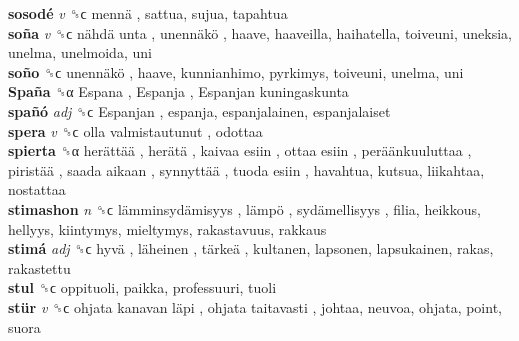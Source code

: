 \textbf{sosodé} \emph{v}  ␝ϲ   mennä , sattua, sujua, tapahtua  \\
\textbf{soña} \emph{v}  ␝ϲ   nähdä unta ,  unennäkö , haave, haaveilla, haihatella, toiveuni, uneksia, unelma, unelmoida, uni  \\
\textbf{soño} ␝ϲ   unennäkö , haave, kunnianhimo, pyrkimys, toiveuni, unelma, uni  \\
\textbf{Spaña} ␝α   Espana ,  Espanja ,  Espanjan kuningaskunta   \\
\textbf{spañó} \emph{adj}  ␝ϲ   Espanjan , espanja, espanjalainen, espanjalaiset  \\
\textbf{spera} \emph{v}  ␝ϲ   olla valmistautunut , odottaa  \\
\textbf{spierta} ␝α   herättää ,  herätä ,  kaivaa esiin ,  ottaa esiin ,  peräänkuuluttaa ,  piristää ,  saada aikaan ,  synnyttää ,  tuoda esiin , havahtua, kutsua, liikahtaa, nostattaa  \\
\textbf{stimashon} \emph{n}  ␝ϲ   lämminsydämisyys ,  lämpö ,  sydämellisyys , filia, heikkous, hellyys, kiintymys, mieltymys, rakastavuus, rakkaus  \\
\textbf{stimá} \emph{adj}  ␝ϲ   hyvä ,  läheinen ,  tärkeä , kultanen, lapsonen, lapsukainen, rakas, rakastettu  \\
\textbf{stul} ␝ϲ  oppituoli, paikka, professuuri, tuoli  \\
\textbf{stür} \emph{v}  ␝ϲ   ohjata kanavan läpi ,  ohjata taitavasti , johtaa, neuvoa, ohjata, point, suora  \\
